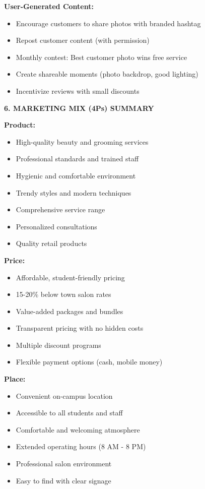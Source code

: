 \documentclass[a4paper,12pt]{article}
\begin{document}
\textbf{User-Generated Content:}
\begin{itemize}[leftmargin=2em]
    \item Encourage customers to share photos with branded hashtag
    \item Repost customer content (with permission)
    \item Monthly contest: Best customer photo wins free service
    \item Create shareable moments (photo backdrop, good lighting)
    \item Incentivize reviews with small discounts
\end{itemize}

\vspace{1em}

\textbf{6. MARKETING MIX (4Ps) SUMMARY}

\textbf{Product:}
\begin{itemize}[leftmargin=2em]
    \item High-quality beauty and grooming services
    \item Professional standards and trained staff
    \item Hygienic and comfortable environment
    \item Trendy styles and modern techniques
    \item Comprehensive service range
    \item Personalized consultations
    \item Quality retail products
\end{itemize}

\textbf{Price:}
\begin{itemize}[leftmargin=2em]
    \item Affordable, student-friendly pricing
    \item 15-20\% below town salon rates
    \item Value-added packages and bundles
    \item Transparent pricing with no hidden costs
    \item Multiple discount programs
    \item Flexible payment options (cash, mobile money)
\end{itemize}

\textbf{Place:}
\begin{itemize}[leftmargin=2em]
    \item Convenient on-campus location
    \item Accessible to all students and staff
    \item Comfortable and welcoming atmosphere
    \item Extended operating hours (8 AM - 8 PM)
    \item Professional salon environment
    \item Easy to find with clear signage
\end{itemize}
\end{document}
